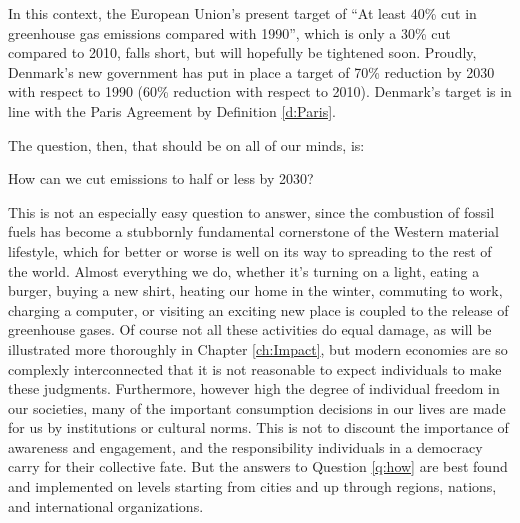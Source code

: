 In this context, the European Union's present target of ``At least 40\% cut in greenhouse gas emissions compared with 1990''\cite{EC_2030}, which is only a 30\% cut compared to 2010\cite{Ritchie2019a}, falls short, but will hopefully be tightened soon. Proudly, Denmark's new government has put in place a target of 70\% reduction by 2030 with respect to 1990 (60\% reduction with respect to 2010)\cite{CHN_70p}. Denmark's target is in line with the Paris Agreement by Definition \ref{d:Paris}. 



The question, then, that should be on all of our minds, is:

\begin{question}
How can we cut emissions to half or less by 2030? \label{q:how}
\end{question}

This is not an especially easy question to answer, since the combustion of fossil fuels has become a stubbornly fundamental cornerstone of the Western material lifestyle, which for better or worse is well on its way to spreading to the rest of the world. Almost everything we do, whether it's turning on a light, eating a burger, buying a new shirt, heating our home in the winter, commuting to work, charging a computer, or visiting an exciting new place is coupled to the release of greenhouse gases. Of course not all these activities do equal damage, as will be illustrated more thoroughly in Chapter \ref{ch:Impact}, but modern economies are so complexly interconnected that it is not reasonable to expect individuals to make these judgments. Furthermore, however high the degree of individual freedom in our societies, many of the important consumption decisions in our lives are made for us by institutions or cultural norms. This is not to discount the importance of awareness and engagement, and the responsibility individuals in a democracy carry for their collective fate. But the answers to Question \ref{q:how} are best found and implemented on levels starting from cities and up through regions, nations, and international organizations.

